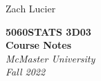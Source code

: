 \documentclass[12pt,notitlepage]{article}
\makeatletter
\theoremstyle{theoremc}
\numberwithin{amstheorem}{section}
\numberwithin{amsdefinition}{section}
\numberwithin{amsexample}{section}
\newcommand\HUGE{\@setfontsize\Huge{50}{60}}
\makeatother
\begin{document}
\AddToShipoutPicture*{\bgpic}

\begin{titlepage} %

    \raggedleft %
    
    \vspace*{\baselineskip} %
    
    
    {\Large Zach Lucier} %
    
    \vspace*{0.167\textheight} %
    
    
    \textbf{\color{main}\HUGE STATS 3D03}\\[\baselineskip]
    \textbf{\color{main}\Huge Course Notes}\\[\baselineskip] 
    
    {\Large \textit{McMaster University}}\\[0.5\baselineskip]
    {\Large \textit{Fall 2022}}
    
    
    
    

\end{titlepage}



\break


\end{document}
